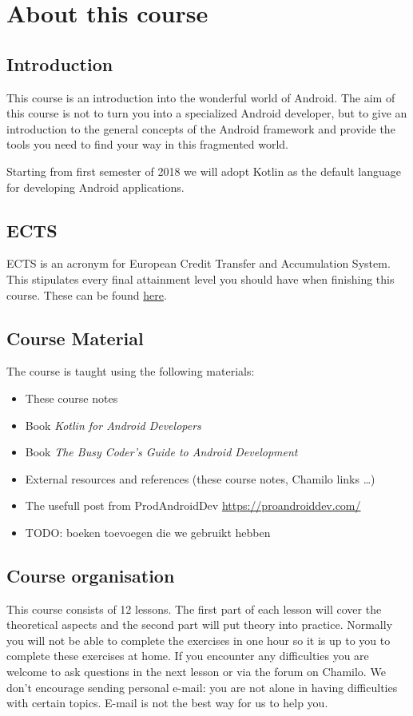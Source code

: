 \chapter{About this course}

\section{Introduction}
This course is an introduction into the wonderful world of Android.
The aim of this course is not to turn you into a specialized Android developer, but to give an introduction to the general concepts of the Android framework and provide the tools you need to find your way in this fragmented world. 

Starting from first semester of 2018 we will adopt Kotlin as the default language for developing Android applications. 

\section{ECTS}
ECTS is an acronym for European Credit Transfer and Accumulation System.
This stipulates every final attainment level you should have when finishing this course.
These can be found \href{https://bamaflexweb.hogent.be/BMFUIDetailxOLOD.aspx?a=98522\&b=5\&c=1}{here}. 

\section{Course Material}
The course is taught using the following materials:

\begin{itemize}
	\item These course notes
	\item Book \textit{Kotlin for Android Developers} \cite{Leiva2018}
	\item Book  \textit{The Busy Coder's Guide to Android Development} \cite{murphymarkl.2017}
	\item External resources and references (these course notes, Chamilo links \dots)
	\item The usefull post from ProdAndroidDev \url{https://proandroiddev.com/}
	\item TODO: boeken toevoegen die we gebruikt hebben
\end{itemize}

\section{Course organisation}
This course consists of 12 lessons.
The first part of each lesson will cover the theoretical aspects and the second part will put theory into practice.
Normally you will not be able to complete the exercises in one hour so it is up to you to complete these exercises at home.
If you encounter any difficulties  you are welcome to ask questions in the next lesson or via the forum on Chamilo.
We don't encourage sending personal e-mail: you are not alone in having difficulties with certain topics.
E-mail is not the best way for us to help you.

